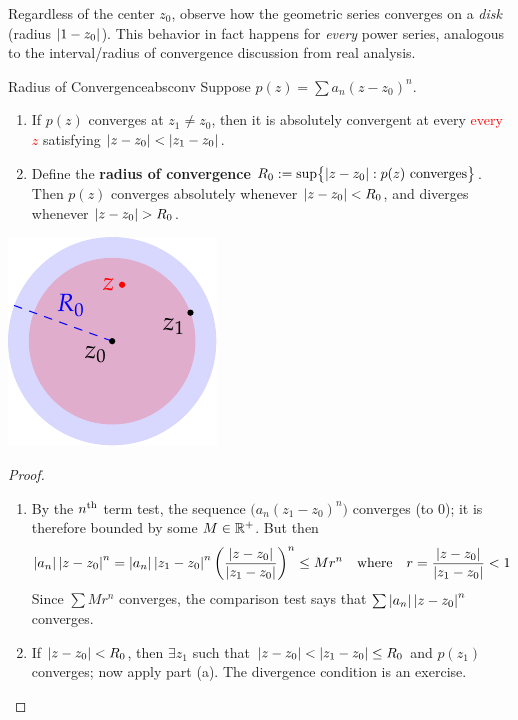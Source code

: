 Regardless of the center $z_0$, observe how the geometric series converges on a \emph{disk} (radius $\left| 1-z_0\right|$). This behavior in fact happens for \emph{every} power series, analogous to the interval/radius of convergence discussion from real analysis.


\begin{thm}[lower separated=false, sidebyside, sidebyside align=top seam, sidebyside gap=0pt, righthand width=0.23\linewidth]{Radius of Convergence}{absconv}
	Suppose $p(z)=\sum a_n(z-z_0)^n$.
	\begin{enumerate}
	  \item If $p(z)$ converges at $z_1\neq z_0$, then it is absolutely convergent at every \textcolor{red}{every $z$} satisfying $\left| z-z_0\right|<\left| z_1-z_0\right|$.
		\item Define the \textbf{radius of convergence} $R_0:=\sup\bigl\{\left| z-z_0\right|: p(z) \text{ converges}\bigr\}$. Then $p(z)$ converges absolutely whenever $\left| z-z_0\right|<R_0$, and diverges whenever $\nm{z-z_0}>R_0$.
	\end{enumerate}
	\tcblower
	\flushright\includegraphics[scale=0.95]{conv}
\end{thm}



\begin{proof}
	\begin{enumerate}
	  \item By the $n\textsuperscript{th}$ term test, the sequence $\bigl(a_n(z_1-z_0)^n\bigr)$ converges (to 0); it is therefore bounded by some $M\in\mathbb{R}^+$. But then
		\[
			\left| a_n\right|\left| z-z_0\right|^n
			=\left| a_n\right|\left| z_1-z_0\right|^n\left(\frac{\left| z-z_0\right|}{\left| z_1-z_0\right|}\right)^n
			\le Mr^n
			\quad\text{where}\quad 
			r=\frac{\left| z-z_0\right|}{\left| z_1-z_0\right|}<1
		\]
		Since $\sum Mr^n$ converges, the comparison test says that $\sum\left| a_n\right|\left| z-z_0\right|^n$ converges.
		\item If $\left| z-z_0\right|<R_0$, then $\exists z_1$ such that $\left| z-z_0\right|<\left| z_1-z_0\right|\le R_0$ and $p(z_1)$ converges; now apply part (a). The divergence condition is an exercise.\qedhere
	\end{enumerate}
\end{proof}

